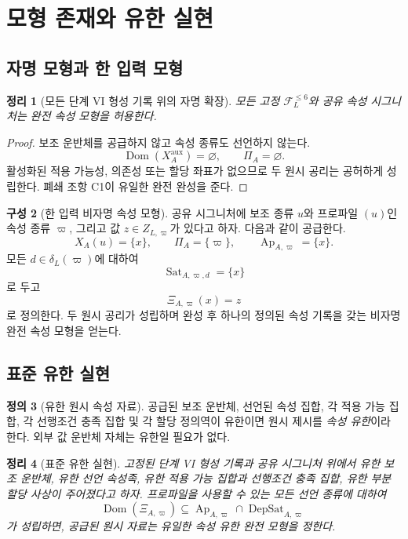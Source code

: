 \documentclass[11pt]{article}
\newcommand{\FVI}{\mathcal F_{L}^{\le 6}}
\newcommand{\Ap}{\operatorname{Ap}}
\newcommand{\DepSat}{\operatorname{DepSat}}
\newcommand{\Sat}{\operatorname{Sat}}
\newcommand{\Dom}{\operatorname{Dom}}
\newtheorem{theorem}{정리}[section]
\theoremstyle{definition}
\newtheorem{definition}[theorem]{정의}
\newtheorem{construction}[theorem]{구성}
\theoremstyle{remark}
\begin{document}
\section{모형 존재와 유한 실현}
\label{sec:finite}

\subsection{자명 모형과 한 입력 모형}

\begin{theorem}[모든 단계 VI 형성 기록 위의 자명 확장]
\label{thm:trivial-extension}
모든 고정 \(\FVI\)와 공유 속성 시그니처는 완전 속성 모형을 허용한다.
\end{theorem}

\begin{proof}
보조 운반체를 공급하지 않고 속성 종류도 선언하지 않는다.
\[
\Dom(X_A^{\mathrm{aux}})=\varnothing,
\qquad
\Pi_A=\varnothing.
\]
활성화된 적용 가능성, 의존성 또는 할당 좌표가 없으므로 두 원시 공리는 공허하게 성립한다.
폐쇄 조항 C1이 유일한 완전 완성을 준다.
\end{proof}

\begin{construction}[한 입력 비자명 속성 모형]
공유 시그니처에 보조 종류 \(u\)와 프로파일 \((u)\)인 속성 종류 \(\varpi\), 그리고 값 \(z\in Z_{L,\varpi}\)가 있다고 하자.
다음과 같이 공급한다.
\[
X_A(u)=\{x\},
\qquad
\Pi_A=\{\varpi\},
\qquad
\Ap_{A,\varpi}=\{x\}.
\]
모든 \(d\in\delta_L(\varpi)\)에 대하여
\[
\Sat_{A,\varpi,d}=\{x\}
\]
로 두고
\[
\Xi_{A,\varpi}(x)=z
\]
로 정의한다.
두 원시 공리가 성립하며 완성 후 하나의 정의된 속성 기록을 갖는 비자명 완전 속성 모형을 얻는다.
\end{construction}

\subsection{표준 유한 실현}

\begin{definition}[유한 원시 속성 자료]
공급된 보조 운반체, 선언된 속성 집합, 각 적용 가능 집합, 각 선행조건 충족 집합 및 각 할당 정의역이 유한이면 원시 제시를 \emph{속성 유한}이라 한다.
외부 값 운반체 자체는 유한일 필요가 없다.
\end{definition}

\begin{theorem}[표준 유한 실현]
\label{thm:finite-realization}
고정된 단계 VI 형성 기록과 공유 시그니처 위에서 유한 보조 운반체, 유한 선언 속성족, 유한 적용 가능 집합과 선행조건 충족 집합, 유한 부분 할당 사상이 주어졌다고 하자.
프로파일을 사용할 수 있는 모든 선언 종류에 대하여
\[
\Dom(\Xi_{A,\varpi})
\subseteq
\Ap_{A,\varpi}\cap\DepSat_{A,\varpi}
\]
가 성립하면, 공급된 원시 자료는 유일한 속성 유한 완전 모형을 정한다.
\end{theorem}
\end{document}

